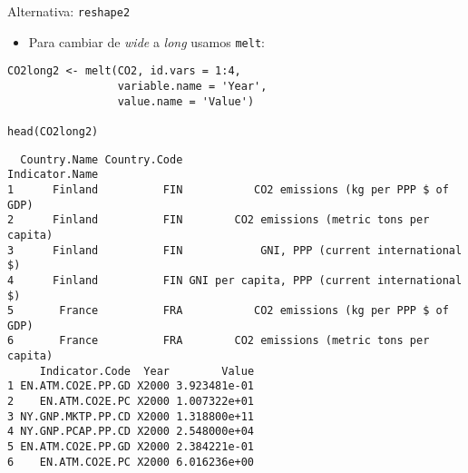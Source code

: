 \documentclass[xcolor={usenames,svgnames,dvipsnames}]{beamer}
\begin{document}
\begin{frame}[fragile,label=sec-4-9]{Alternativa: \texttt{reshape2}}
 \begin{itemize}
\item Para cambiar de \emph{wide} a \emph{long} usamos \texttt{melt}:
\end{itemize}
\lstset{language=R,label= ,caption= ,numbers=none}
\begin{lstlisting}
CO2long2 <- melt(CO2, id.vars = 1:4,
                 variable.name = 'Year',
                 value.name = 'Value')

head(CO2long2)
\end{lstlisting}

\begin{verbatim}
  Country.Name Country.Code                                Indicator.Name
1      Finland          FIN           CO2 emissions (kg per PPP $ of GDP)
2      Finland          FIN        CO2 emissions (metric tons per capita)
3      Finland          FIN            GNI, PPP (current international $)
4      Finland          FIN GNI per capita, PPP (current international $)
5       France          FRA           CO2 emissions (kg per PPP $ of GDP)
6       France          FRA        CO2 emissions (metric tons per capita)
     Indicator.Code  Year        Value
1 EN.ATM.CO2E.PP.GD X2000 3.923481e-01
2    EN.ATM.CO2E.PC X2000 1.007322e+01
3 NY.GNP.MKTP.PP.CD X2000 1.318800e+11
4 NY.GNP.PCAP.PP.CD X2000 2.548000e+04
5 EN.ATM.CO2E.PP.GD X2000 2.384221e-01
6    EN.ATM.CO2E.PC X2000 6.016236e+00
\end{verbatim}
\end{frame}
\end{document}
